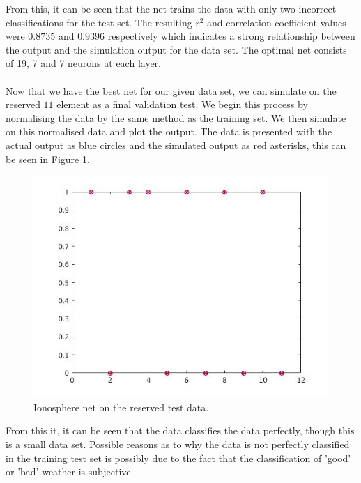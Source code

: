 \documentclass{article}%
\begin{document}
From this, it can be seen that the net trains the data with only two incorrect classifications for the test set. The resulting $r^2$ and correlation coefficient values were $0.8735$ and $0.9396$ respectively which indicates a strong relationship between the output and the simulation output for the data set. The optimal net consists of 19, 7 and 7 neurons at each layer.
\\
\\
Now that we have the best net for our given data set, we can simulate on the reserved $11$ element as a final validation test. We begin this process by normalising the data by the same method as the training set. We then simulate on this normalised data and plot the output. The data is presented with the actual output as blue circles and the simulated output as red asterisks, this can be seen in Figure \ref{fig:iontest}.
\begin{figure}[H]
\centering
\includegraphics[scale=0.5]{Images/iontest.jpg}
\caption{Ionosphere net on the reserved test data.}
\label{fig:iontest}
\end{figure}
From this it, it can be seen that the data classifies the data perfectly, though this is a small data set. Possible reasons as to why the data is not perfectly classified in the training test set is possibly due to the fact that the classification of 'good' or 'bad' weather is subjective.
\end{document}
